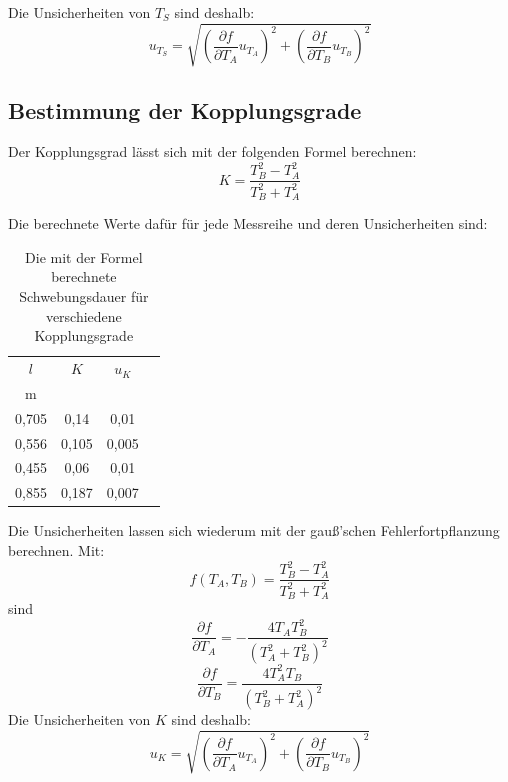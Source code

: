 \documentclass[11pt,a4paper]{article}
\begin{document}
Die Unsicherheiten von $T_S$ sind deshalb:
$$u_{T_S} = \sqrt{(\frac{\partial f}{\partial T_A}u_{T_A})^2+(\frac{\partial f}{\partial T_B}u_{T_B})^2}$$

\subsection{Bestimmung der Kopplungsgrade}
Der Kopplungsgrad lässt sich mit der folgenden Formel berechnen:
\begin{equation}
K = \frac{T_B^2-T_A^2}{T_B^2+T_A^2}
\end{equation}

Die berechnete Werte dafür für jede Messreihe und deren Unsicherheiten sind: 
\begin{table}[h]
	\centering
	\begin{tabular*}{0.99\textwidth}{@{\extracolsep{\fill}}cccc}
		\toprule
		$l$ & $K$ & $u_{K}$  \\
		m &  &    \\
		\bottomrule
		0,705 & 0,14 & 0,01 \\
		0,556 & 0,105 & 0,005 \\
		0,455 & 0,06 & 0,01 \\
		0,855 & 0,187 & 0,007 \\
		\bottomrule
	\end{tabular*}
	\caption{Die mit der Formel berechnete Schwebungsdauer für verschiedene Kopplungsgrade}
	\label{tabelle}
\end{table}

Die Unsicherheiten lassen sich wiederum mit der gauß'schen Fehlerfortpflanzung berechnen. Mit:
$$f(T_A,T_B) = \frac{T_B^2-T_A^2}{T_B^2+T_A^2}$$
sind
$$\frac{\partial f}{\partial T_A} = -\frac{4T_A T_B^2}{(T_A^2+T_B^2)^2}$$
$$\frac{\partial f}{\partial T_B} = \frac{4T_A^2 T_B}{(T_B^2+T_A^2)^2}$$
Die Unsicherheiten von $K$ sind deshalb:
$$u_{K} = \sqrt{(\frac{\partial f}{\partial T_A}u_{T_A})^2+(\frac{\partial f}{\partial T_B}u_{T_B})^2}$$
\end{document}
